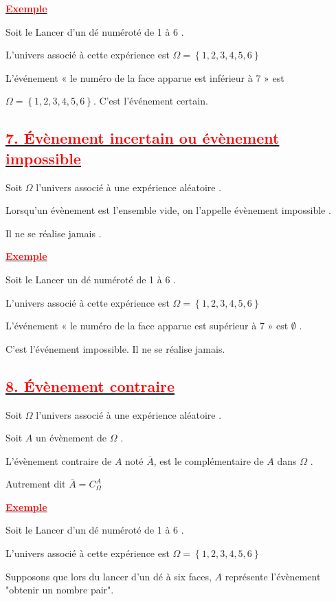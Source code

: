 \documentclass[12pt]{article}
\begin{document}
\underline{\textbf{\textcolor{red}{Exemple}}}

Soit le Lancer d’un dé numéroté de 1 à 6 .

L’univers associé à cette expérience est $\Omega = \left\lbrace 1, 2, 3, 4, 5, 6\right\rbrace $

L’événement « le numéro de la face apparue est inférieur à 7 » est 

$\Omega = \left\lbrace 1, 2, 3, 4, 5, 6\right\rbrace $. C’est l’événement certain.

\subsection*{\underline{\textbf{\textcolor{red}{7. Évènement incertain ou évènement impossible}}}}
Soit $\Omega$ l’univers associé à une expérience aléatoire .

Lorsqu’un évènement est l’ensemble vide, on l’appelle évènement impossible .

Il ne se réalise jamais .

\underline{\textbf{\textcolor{red}{Exemple}}}

Soit le Lancer un dé numéroté de 1 à 6 .

L’univers associé à cette expérience est $\Omega = \left\lbrace 1, 2, 3, 4, 5, 6 \right\rbrace $

L’événement « le numéro de la face apparue est supérieur à 7 » est $\emptyset$ .

C’est l’événement impossible. Il ne se réalise jamais.
\subsection*{\underline{\textbf{\textcolor{red}{8. Évènement contraire}}}}

Soit $\Omega$ l’univers associé à une expérience aléatoire .

Soit $A$ un évènement de $\Omega$ . 

L’évènement contraire de $A$ noté $\overline{A}$, est le complémentaire de $A$ dans $\Omega$ .

Autrement dit $\overline{A}=C^{A}_{\Omega}$

\underline{\textbf{\textcolor{red}{Exemple}}}

Soit le Lancer d’un dé numéroté de 1 à 6 .

L’univers associé à cette expérience est $\Omega = \left\lbrace 1, 2, 3, 4, 5, 6 \right\rbrace $

Supposons que lors du lancer d'un dé à six faces, $A$ représente l'évènement "obtenir un nombre pair".
\end{document}
